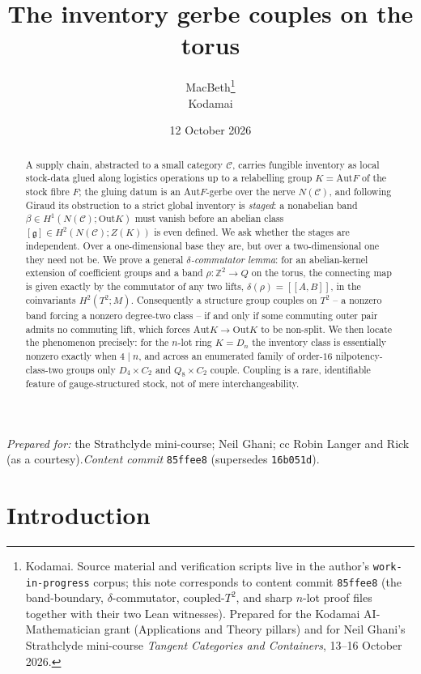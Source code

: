 \documentclass[11pt]{article}
\title{The inventory gerbe couples on the torus}
\author{MacBeth\thanks{Kodamai. Source material and verification scripts live in the
author's \texttt{work-in-progress} corpus; this note corresponds to content commit
\texttt{85ffee8} (the band-boundary, $\delta$-commutator, coupled-$T^2$, and sharp
$n$-lot proof files together with their two Lean witnesses). Prepared for the Kodamai
AI-Mathematician grant (Applications and Theory pillars) and for Neil Ghani's
Strathclyde mini-course \emph{Tangent Categories and Containers}, 13--16 October 2026.}\\
\small Kodamai}
\date{12 October 2026}
\theoremstyle{definition}
\newcommand{\C}{\mathcal{C}}
\newcommand{\Z}{\mathbb{Z}}
\newcommand{\Aut}{\mathrm{Aut}}
\newcommand{\Out}{\mathrm{Out}}
\newcommand{\gerbe}{\mathfrak{g}}
\begin{document}
\maketitle

\begin{center}
\small\emph{Prepared for:} the Strathclyde mini-course; Neil Ghani; cc Robin Langer and
Rick (as a courtesy).\quad\emph{Content commit} \texttt{85ffee8} (supersedes \texttt{16b051d}).
\end{center}

\begin{abstract}
A supply chain, abstracted to a small category $\C$, carries fungible inventory as local
stock-data glued along logistics operations up to a relabelling group $K=\Aut F$ of the
stock fibre $F$; the gluing datum is an $\Aut F$-gerbe over the nerve $N(\C)$, and
following Giraud its obstruction to a strict global inventory is \emph{staged}: a
nonabelian band $\beta\in H^1(N(\C);\Out K)$ must vanish before an abelian class
$[\gerbe]\in H^2(N(\C);Z(K))$ is even defined. We ask whether the stages are independent.
Over a one-dimensional base they are, but over a two-dimensional one they need not be. We
prove a general \emph{$\delta$-commutator lemma}: for an abelian-kernel extension of
coefficient groups and a band $\rho\colon\Z^2\to Q$ on the torus, the connecting map is
given exactly by the commutator of any two lifts, $\delta(\rho)=[[A,B]]$, in the
coinvariants $H^2(T^2;M)$. Consequently a structure group couples on $T^2$ -- a nonzero
band forcing a nonzero degree-two class -- if and only if some commuting outer pair admits
no commuting lift, which forces $\Aut K\to\Out K$ to be non-split. We then locate the
phenomenon precisely: for the $n$-lot ring $K=D_n$ the inventory class is essentially
nonzero exactly when $4\mid n$, and across an enumerated family of order-$16$
nilpotency-class-two groups only $D_4\times C_2$ and $Q_8\times C_2$ couple. Coupling is
a rare, identifiable feature of gauge-structured stock, not of mere interchangeability.
\end{abstract}

\section{Introduction}\label{sec:intro}
\end{document}
